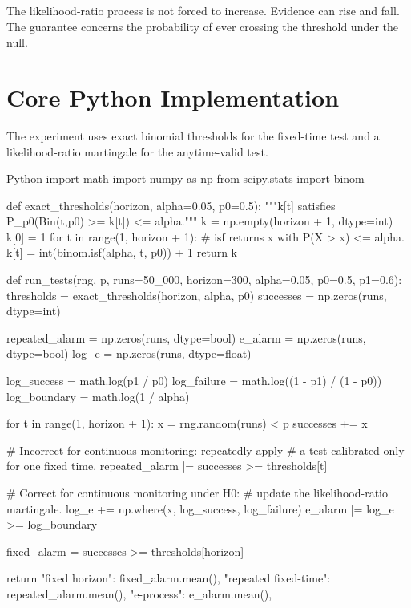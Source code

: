 \documentclass[en,nofont,11pt]{elegantbook}
\begin{document}
The likelihood-ratio process is not forced to increase. Evidence can rise and fall. The guarantee concerns the probability of ever crossing the threshold under the null.

\chapter{Core Python Implementation}

The experiment uses exact binomial thresholds for the fixed-time test and a likelihood-ratio martingale for the anytime-valid test.

\begin{codeblock}{Python}
import math
import numpy as np
from scipy.stats import binom


def exact_thresholds(horizon, alpha=0.05, p0=0.5):
    """k[t] satisfies P_{p0}(Bin(t,p0) >= k[t]) <= alpha."""
    k = np.empty(horizon + 1, dtype=int)
    k[0] = 1
    for t in range(1, horizon + 1):
        # isf returns x with P(X > x) <= alpha.
        k[t] = int(binom.isf(alpha, t, p0)) + 1
    return k


def run_tests(rng, p, runs=50_000, horizon=300,
              alpha=0.05, p0=0.5, p1=0.6):
    thresholds = exact_thresholds(horizon, alpha, p0)
    successes = np.zeros(runs, dtype=int)

    repeated_alarm = np.zeros(runs, dtype=bool)
    e_alarm = np.zeros(runs, dtype=bool)
    log_e = np.zeros(runs, dtype=float)

    log_success = math.log(p1 / p0)
    log_failure = math.log((1 - p1) / (1 - p0))
    log_boundary = math.log(1 / alpha)

    for t in range(1, horizon + 1):
        x = rng.random(runs) < p
        successes += x

        # Incorrect for continuous monitoring: repeatedly apply
        # a test calibrated only for one fixed time.
        repeated_alarm |= successes >= thresholds[t]

        # Correct for continuous monitoring under H0:
        # update the likelihood-ratio martingale.
        log_e += np.where(x, log_success, log_failure)
        e_alarm |= log_e >= log_boundary

    fixed_alarm = successes >= thresholds[horizon]

    return {
        "fixed horizon": fixed_alarm.mean(),
        "repeated fixed-time": repeated_alarm.mean(),
        "e-process": e_alarm.mean(),
    }
\end{codeblock}
\end{document}

